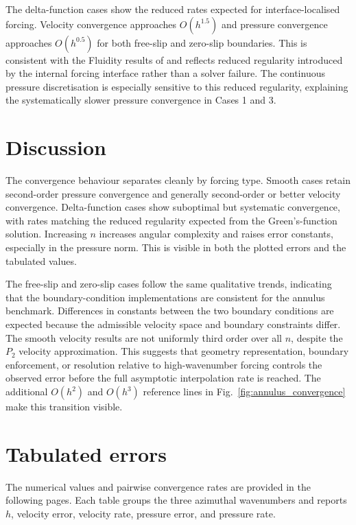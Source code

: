\documentclass[11pt,a4paper]{article}
\begin{document}
The delta-function cases show the reduced rates expected for interface-localised forcing. Velocity convergence approaches \(O(h^{1.5})\) and pressure convergence approaches \(O(h^{0.5})\) for both free-slip and zero-slip boundaries. This is consistent with the Fluidity results of \citet{kramer2021} and reflects reduced regularity introduced by the internal forcing interface rather than a solver failure. The continuous pressure discretisation is especially sensitive to this reduced regularity, explaining the systematically slower pressure convergence in Cases 1 and 3.

\section{Discussion}

The convergence behaviour separates cleanly by forcing type. Smooth cases retain second-order pressure convergence and generally second-order or better velocity convergence. Delta-function cases show suboptimal but systematic convergence, with rates matching the reduced regularity expected from the Green's-function solution. Increasing \(n\) increases angular complexity and raises error constants, especially in the pressure norm. This is visible in both the plotted errors and the tabulated values.

The free-slip and zero-slip cases follow the same qualitative trends, indicating that the boundary-condition implementations are consistent for the annulus benchmark. Differences in constants between the two boundary conditions are expected because the admissible velocity space and boundary constraints differ. The smooth velocity results are not uniformly third order over all \(n\), despite the \(P_2\) velocity approximation. This suggests that geometry representation, boundary enforcement, or resolution relative to high-wavenumber forcing controls the observed error before the full asymptotic interpolation rate is reached. The additional \(O(h^2)\) and \(O(h^3)\) reference lines in Fig.~\ref{fig:annulus_convergence} make this transition visible.

\section{Tabulated errors}

The numerical values and pairwise convergence rates are provided in the following pages. Each table groups the three azimuthal wavenumbers and reports \(h\), velocity error, velocity rate, pressure error, and pressure rate.
\end{document}
